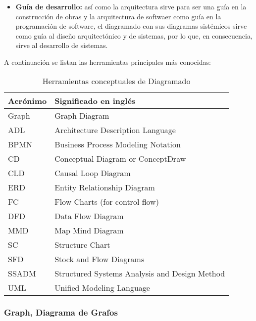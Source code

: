 \begin{itemize}
\item \textbf{Guía de desarrollo:} así como la arquitectura sirve para ser una guía en la construcción de obras y la arquitectura de softwaer como guía en la programación de software, el diagramado con sus diagramas sistémicos sirve como guía al diseño arquitectónico y de sistemas, por lo que, en consecuencia, sirve al desarrollo de sistemas.

\end{itemize}

A continuación se listan las herramientas principales más conocidas:

\begin{table}[h]
\centering
\caption{Herramientas conceptuales de Diagramado}
\label{Herramientas-conceptuales-de-Diagramado}
\begin{tabular}{|l|l|}
\hline
Acrónimo & Significado en inglés                         \\ \hline
Graph    & Graph Diagram                                 \\ \hline
ADL      & Architecture Description Language             \\ \hline
BPMN     & Business Process Modeling Notation            \\ \hline
CD       & Conceptual Diagram or ConceptDraw             \\ \hline
CLD      & Causal Loop Diagram                           \\ \hline
ERD      & Entity Relationship Diagram                   \\ \hline
FC       & Flow Charts (for control flow)                \\ \hline
DFD      & Data Flow Diagram                             \\ \hline
MMD      & Map Mind Diagram                              \\ \hline
SC       & Structure Chart                               \\ \hline
SFD      & Stock and Flow Diagrams                       \\ \hline
SSADM    & Structured Systems Analysis and Design Method \\ \hline
UML      & Unified Modeling Language                     \\ \hline
\end{tabular}
\end{table}

\subsubsection{Graph, Diagrama de Grafos}

